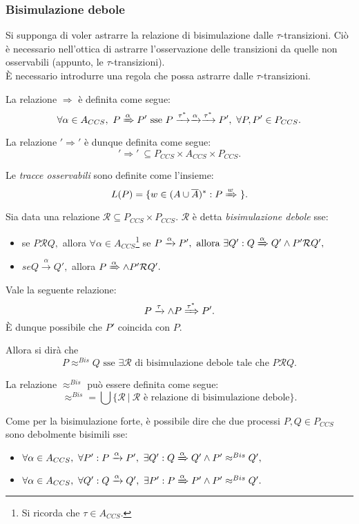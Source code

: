 \subsubsection{Bisimulazione debole}
Si supponga di voler astrarre la relazione di bisimulazione dalle $\tau$-transizioni. Ci\`o \`e necessario nell'ottica di astrarre l'osservazione delle transizioni da quelle non osservabili (appunto, le $\tau$-transizioni).\\
\`E necessario introdurre una regola che possa astrarre dalle $\tau$-transizioni. 
\begin{deff}
	La relazione $\Rightarrow$ \`e definita come segue: $$\forall \alpha \in A_{CCS},\ P \xRightarrow{\alpha} P' \text{ sse } P \xrightarrow{\tau^*} \xrightarrow{\alpha} \xrightarrow{\tau^*} P',\ \forall P, P' \in P_{CCS}.$$
\end{deff}
La relazione $'\Rightarrow'$ \`e dunque definita come segue: $$'\Rightarrow'\ \subseteq P_{CCS} \times A_{CCS} \times P_{CCS}.$$

\begin{deff}
	Le \emph{tracce osservabili} sono definite come l'insieme: $$L(P) = \{ w \in (A \cup \overline{A})^* : P \xRightarrow{w}\ \}.$$
\end{deff}

\begin{deff}
	Sia data una relazione $\mathcal{R} \subseteq P_{CCS} \times P_{CCS}. $ $\mathcal{R} $ \`e detta \emph{bisimulazione debole} sse:
	\begin{itemize}
		\item se $P \mathcal{R} Q, $ allora $\forall \alpha \in A_{CCS}$\footnote{Si ricorda che $\tau \in A_{CCS}.$} se $P \xrightarrow{\alpha} P', \text{ allora } \exists Q' : Q \xRightarrow{\alpha} Q' \land P' \mathcal{R} Q',$
		\item $ se Q \xrightarrow{\alpha} Q',$ allora $ P \xRightarrow{\alpha} \land P' \mathcal{R} Q'.$
	\end{itemize}
\end{deff}
\begin{lemma}
	Vale la seguente relazione: $$ P \xrightarrow{\tau} \land P \xRightarrow{\tau^*} P'.$$ \`E dunque possibile che $P'$ coincida con $P$.
\end{lemma}
Allora si dir\`a che $$P \approx^{Bis} Q \text{ sse } \exists \mathcal{R} \text{ di bisimulazione debole tale che } P \mathcal{R} Q.$$
\begin{deff}
	La relazione $ \approx^{Bis}$ pu\`o essere definita come segue: $$\approx^{Bis} = \bigcup \{\mathcal{R}\ |\ \mathcal{R} \text{ \`e relazione di bisimulazione debole}\}. $$
\end{deff}
Come per la bisimulazione forte, \`e possibile dire che due processi $P, Q \in P_{CCS}$ sono debolmente bisimili sse: 
\begin{itemize}
	\item $\forall \alpha \in A_{CCS},\ \forall P' : P \xrightarrow{\alpha}P',\ \exists Q': Q \xRightarrow{\alpha}Q' \land P' \approx^{Bis} Q',$
	\item $\forall \alpha \in A_{CCS},\ \forall Q' : Q \xrightarrow{\alpha}Q',\ \exists P': P \xRightarrow{\alpha}P' \land P' \approx^{Bis} Q'.$
\end{itemize}